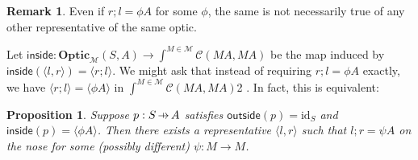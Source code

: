 \documentclass[11pt,a4paper]{article}
\theoremstyle{plain}
\newtheorem{proposition}[theorem]{Proposition}
\theoremstyle{definition}
\newtheorem{remark}[theorem]{Remark}
\newcommand{\C}{\mathscr{C}}
\newcommand{\M}{\mathscr{M}}
\newcommand{\Optic}{\mathbf{Optic}}
\newcommand{\id}{\mathrm{id}}
\newcommand{\inside}{\mathsf{inside}}
\newcommand{\outside}{\mathsf{outside}}
\newcommand{\hto}{\ensuremath{\,\mathaccent\shortmid\rightarrow\,}}
\begin{document}
\begin{remark}
Even if $r;l = \phi A$ for some $\phi$, the same is not necessarily true of any other representative of the same optic.
\end{remark}

Let $\inside : \Optic_\M(S, A) \to \int^{M \in \M} \C(M A, M A)$ be the map induced by $\inside(\langle l, r \rangle) = \langle r ; l \rangle$. We might ask that instead of requiring $r;l = \phi A$ exactly, we have $\langle r ; l \rangle = \langle \phi A \rangle$ in $\int^{M \in \M} \C(M A, M A)$2  . In fact, this is equivalent:

\begin{proposition}
\label{prop-onthenose}
Suppose $p : S \hto A$ satisfies $\outside(p) = \id_S$ and $\inside(p) = \langle \phi A \rangle$. Then there exists a representative $\langle l, r \rangle$ such that $l ; r = \psi A$ on the nose for some (possibly different) $\psi : M \to M$.
\end{proposition}
\end{document}

